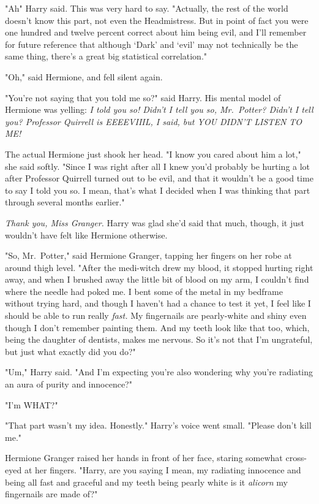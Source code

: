 "Ah{\el}" Harry said. This was very hard to say. "Actually, the rest of the
world doesn't know this part, not even the Headmistress. But in point of fact
you were one hundred and twelve percent correct about him being evil, and I'll
remember for future reference that although `Dark' and `evil' may not
technically be the same thing, there's a great big statistical correlation."

"Oh," said Hermione, and fell silent again.

"You're not saying that you told me so?" said Harry. His mental model of
Hermione was yelling: \emph{I told you so! Didn't I tell you so, Mr.~Potter? Didn't I
tell you? Professor Quirrell is EEEEVIIIL, I said, but YOU DIDN'T LISTEN
TO ME!}

The actual Hermione just shook her head. "I know you cared about him a lot,"
she said softly. "Since I was right after all{\el} I knew you'd probably be
hurting a lot after Professor Quirrell turned out to be evil, and that it
wouldn't be a good time to say I told you so. I mean, that's what I decided
when I was thinking that part through several months earlier."

\emph{Thank you, Miss Granger.} Harry was glad she'd said that much, though, it
just wouldn't have felt like Hermione otherwise.

"So, Mr.~Potter," said Hermione Granger, tapping her fingers on her robe at
around thigh level. "After the medi-witch drew my blood, it stopped hurting
right away, and when I brushed away the little bit of blood on my arm, I
couldn't find where the needle had poked me. I bent some of the metal in my
bedframe without trying hard, and though I haven't had a chance to test it yet,
I feel like I should be able to run really \emph{fast.} My fingernails are
pearly-white and shiny even though I don't remember painting them. And my teeth
look like that too, which, being the daughter of dentists, makes me nervous. So
it's not that I'm ungrateful, but just what exactly did you do?"

"Um," Harry said. "And I'm expecting you're also wondering why you're radiating
an aura of purity and innocence?"

"I'm WHAT?"

"That part wasn't my idea. Honestly." Harry's voice went small. "Please don't
kill me."

Hermione Granger raised her hands in front of her face, staring somewhat
cross-eyed at her fingers. "Harry, are you saying{\el} I mean, my radiating
innocence and being all fast and graceful and my teeth being pearly
white{\el} is it \emph{alicorn} my fingernails are made of?"

